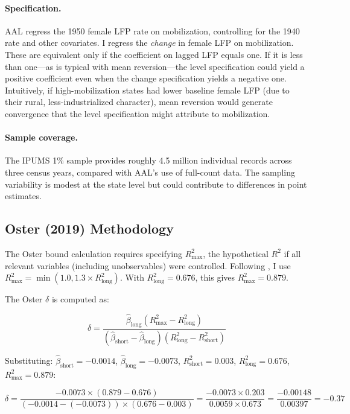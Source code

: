 \documentclass[12pt]{article}
\begin{document}
\paragraph{Specification.} AAL regress the 1950 female LFP rate on mobilization, controlling for the 1940 rate and other covariates. I regress the \textit{change} in female LFP on mobilization. These are equivalent only if the coefficient on lagged LFP equals one. If it is less than one---as is typical with mean reversion---the level specification could yield a positive coefficient even when the change specification yields a negative one. Intuitively, if high-mobilization states had lower baseline female LFP (due to their rural, less-industrialized character), mean reversion would generate convergence that the level specification might attribute to mobilization.

\paragraph{Sample coverage.} The IPUMS 1\% sample provides roughly 4.5 million individual records across three census years, compared with AAL's use of full-count data. The sampling variability is modest at the state level but could contribute to differences in point estimates.

\subsection{Oster (2019) Methodology}

The Oster bound calculation requires specifying $R^2_{\max}$, the hypothetical $R^2$ if all relevant variables (including unobservables) were controlled. Following \citet{oster2019unobservable}, I use $R^2_{\max} = \min(1.0, 1.3 \times R^2_{\text{long}})$. With $R^2_{\text{long}} = 0.676$, this gives $R^2_{\max} = 0.879$.

The Oster $\delta$ is computed as:

\begin{equation}
\delta = \frac{\hat{\beta}_{\text{long}} (R^2_{\max} - R^2_{\text{long}})}{(\hat{\beta}_{\text{short}} - \hat{\beta}_{\text{long}})(R^2_{\text{long}} - R^2_{\text{short}})}
\end{equation}

Substituting: $\hat{\beta}_{\text{short}} = -0.0014$, $\hat{\beta}_{\text{long}} = -0.0073$, $R^2_{\text{short}} = 0.003$, $R^2_{\text{long}} = 0.676$, $R^2_{\max} = 0.879$:

\begin{equation}
\delta = \frac{-0.0073 \times (0.879 - 0.676)}{(-0.0014 - (-0.0073)) \times (0.676 - 0.003)} = \frac{-0.0073 \times 0.203}{0.0059 \times 0.673} = \frac{-0.00148}{0.00397} = -0.37
\end{equation}
\end{document}
